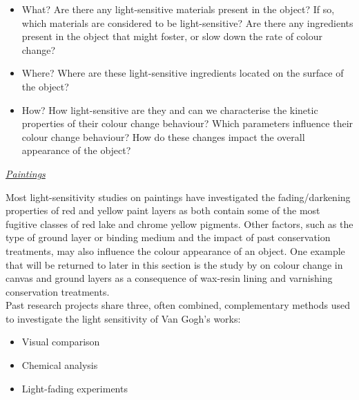 \begin{itemize}
    \item What? Are there any light-sensitive materials present in the object? If so, which materials are considered to be light-sensitive? Are there any ingredients present in the object that might foster, or slow down the rate of colour change?
    \item Where? Where are these light-sensitive ingredients located on the surface of the object?
    \item How? How light-sensitive are they and can we characterise the kinetic properties of their colour change behaviour? Which parameters influence their colour change behaviour? How do these changes impact the overall appearance of the object? 	
\end{itemize}

\vspace{0.5cm}

\textit{\underline{Paintings}}


Most light-sensitivity studies on paintings have investigated the fading/darkening properties of red and yellow paint layers as both contain some of the most fugitive classes of red lake and chrome yellow pigments. Other factors, such as the type of ground layer or binding medium and the impact of past conservation treatments, may also influence the colour appearance of an object. One example that will be returned to later in this section is the study by \citet{nieder_colour_2011} on colour change in canvas and ground layers as a consequence of wax-resin lining and varnishing conservation treatments.\\

Past research projects share three, often combined, complementary methods used to investigate the light sensitivity of Van Gogh's works: 

\begin{itemize}
    \item Visual comparison
    \item Chemical analysis
    \item Light-fading experiments
\end{itemize}


